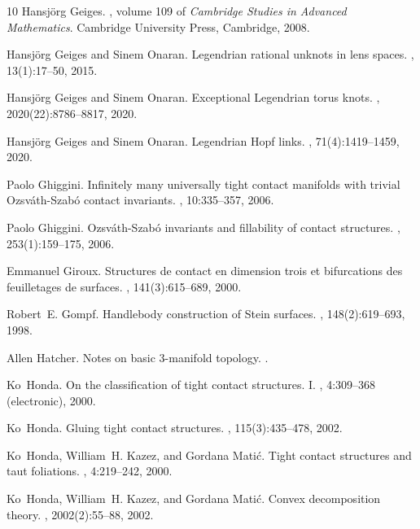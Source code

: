 \documentclass[11pt]{amsart}
\theoremstyle{plain}
\theoremstyle{definition}
\theoremstyle{remark}
\numberwithin{theorem}{section}
\begin{document}
\begin{thebibliography}{10}
Hansj\"{o}rg Geiges.
, volume 109 of {\em
  Cambridge Studies in Advanced Mathematics}.
\newblock Cambridge University Press, Cambridge, 2008.

Hansj\"{o}rg Geiges and Sinem Onaran.
\newblock Legendrian rational unknots in lens spaces.
, 13(1):17--50, 2015.

Hansj{\"o}rg Geiges and Sinem Onaran.
\newblock Exceptional {{Legendrian}} torus knots.
, 2020(22):8786--8817, 2020.

Hansj\"{o}rg Geiges and Sinem Onaran.
\newblock Legendrian {H}opf links.
, 71(4):1419--1459, 2020.

Paolo Ghiggini.
\newblock Infinitely many universally tight contact manifolds with trivial
  {O}zsv\'{a}th-{S}zab\'{o} contact invariants.
, 10:335--357, 2006.

Paolo Ghiggini.
\newblock Ozsv\'{a}th-{S}zab\'{o} invariants and fillability of contact
  structures.
, 253(1):159--175, 2006.

Emmanuel Giroux.
\newblock Structures de contact en dimension trois et bifurcations des
  feuilletages de surfaces.
, 141(3):615--689, 2000.

Robert~E. Gompf.
\newblock Handlebody construction of {S}tein surfaces.
, 148(2):619--693, 1998.

Allen Hatcher.
\newblock Notes on basic 3-manifold topology.
.

Ko~Honda.
\newblock On the classification of tight contact structures. {I}.
, 4:309--368 (electronic), 2000.

Ko~Honda.
\newblock Gluing tight contact structures.
, 115(3):435--478, 2002.

Ko~Honda, William~H. Kazez, and Gordana Mati\'{c}.
\newblock Tight contact structures and taut foliations.
, 4:219--242, 2000.

Ko~Honda, William~H. Kazez, and Gordana Mati{\'c}.
\newblock Convex decomposition theory.
, 2002(2):55--88, 2002.


\end{thebibliography}
\end{document}
